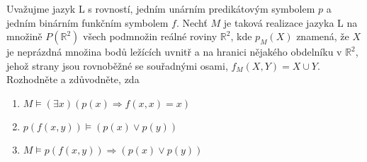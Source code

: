 Uvažujme jazyk L s rovností, jedním unárním predikátovým symbolem $p$ a jedním
binárním funkčním symbolem $f$. Nechť $M$ je taková realizace jazyka L na
množině $P(\mathbb{R}^{2})$ všech podmnožin reálné roviny $\mathbb{R}^{2}$, kde
$p_{M}(X)$ znamená, že $X$ je neprázdná množina bodů ležících uvnitř a na
hranici nějakého obdelníku v $\mathbb{R}^{2}$, jehož strany jsou rovnoběžné se
souřadnými osami, $f_{M}(X,Y) = X \cup Y$. Rozhodněte a zdůvodněte, zda
\begin{enumerate}[(1)]
  \item $M \models (\exists x)(p(x) \Rightarrow f(x,x)=x)$
  \item $p(f(x,y)) \models (p(x) \vee p(y))$
  \item $M \models p(f(x,y)) \Rightarrow (p(x) \vee p(y))$
\end{enumerate}

